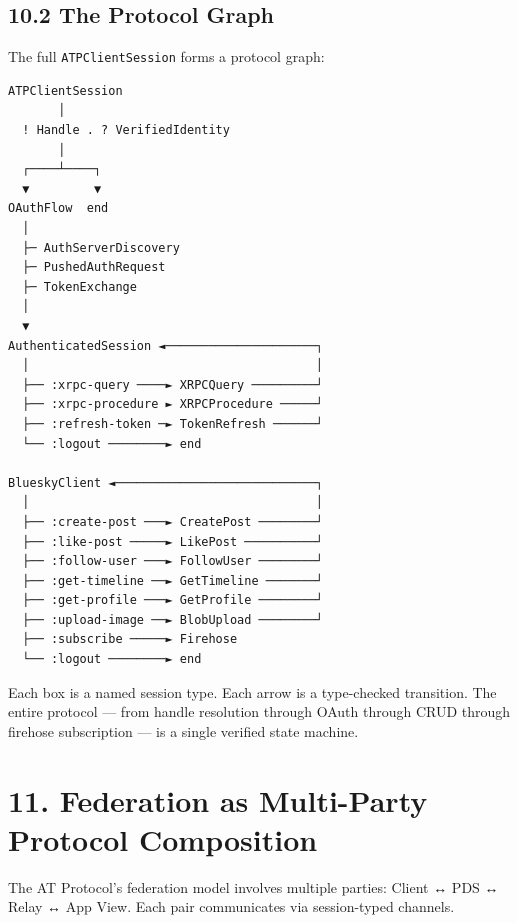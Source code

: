 \documentclass[11pt]{article}
\begin{document}
\subsection{10.2 The Protocol Graph}
\label{sec:org6b290b0}

The full \texttt{ATPClientSession} forms a protocol graph:

\begin{verbatim}
ATPClientSession
       │
  ! Handle . ? VerifiedIdentity
       │
  ┌────┴────┐
  ▼         ▼
OAuthFlow  end
  │
  ├─ AuthServerDiscovery
  ├─ PushedAuthRequest
  ├─ TokenExchange
  │
  ▼
AuthenticatedSession ◄─────────────────────┐
  │                                        │
  ├── :xrpc-query ────► XRPCQuery ─────────┘
  ├── :xrpc-procedure ► XRPCProcedure ─────┘
  ├── :refresh-token ─► TokenRefresh ──────┘
  └── :logout ────────► end

BlueskyClient ◄────────────────────────────┐
  │                                        │
  ├── :create-post ───► CreatePost ────────┘
  ├── :like-post ─────► LikePost ──────────┘
  ├── :follow-user ───► FollowUser ────────┘
  ├── :get-timeline ──► GetTimeline ───────┘
  ├── :get-profile ───► GetProfile ────────┘
  ├── :upload-image ──► BlobUpload ────────┘
  ├── :subscribe ─────► Firehose
  └── :logout ────────► end
\end{verbatim}

Each box is a named session type. Each arrow is a type-checked transition.
The entire protocol --- from handle resolution through OAuth through CRUD
through firehose subscription --- is a single verified state machine.
\section{11. Federation as Multi-Party Protocol Composition}
\label{sec:org47c8cfd}

The AT Protocol's federation model involves multiple parties:
Client ↔ PDS ↔ Relay ↔ App View. Each pair communicates via session-typed
channels.
\end{document}

